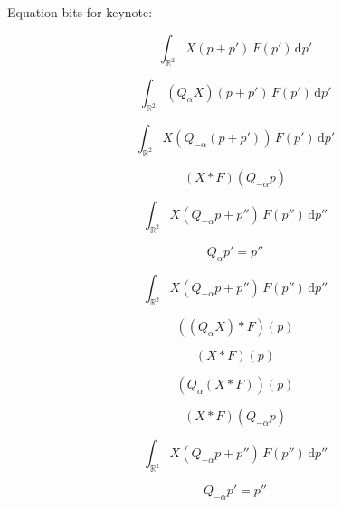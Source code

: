 \documentclass[12pt]{article}
\begin{document}
Equation bits for keynote:

\begin{equation}
  \int_{\mathbb{R}^2}
  X(p + p')\,
  F(p')\,\mathrm{d}p'
\end{equation}


\begin{equation}
  \int_{\mathbb{R}^2} (Q_\alpha X)(p + p')\,F(p')\,\mathrm{d}p'
\end{equation}


\begin{equation}
  \int_{\mathbb{R}^2} X(Q_{-\alpha}(p + p'))\,F(p')\,\mathrm{d}p'
\end{equation}

\begin{equation}
  (X * F)(Q_{-\alpha} p)
\end{equation}

\begin{equation}
  \int_{\mathbb{R}^2} X(Q_{-\alpha} p + p'')\,F(p'')\,\mathrm{d}p''
\end{equation}


\begin{equation}
  Q_\alpha p' = p''
\end{equation}



\begin{equation}
  \int_{\mathbb{R}^2} X(Q_{-\alpha} p + p'')\,F(p'')\,\mathrm{d}p''
\end{equation}


\begin{equation}
  ((Q_\alpha X) * F)(p)
\end{equation}


\begin{equation}
  (X * F)(p)
\end{equation}

\begin{equation}
  (Q_\alpha (X * F))(p)
\end{equation}

\begin{equation}
  (X * F)(Q_{-\alpha} p)
\end{equation}

\begin{equation}
  \int_{\mathbb{R}^2} X(Q_{-\alpha} p + p'')\,F(p'')\,\mathrm{d}p''
\end{equation}


\begin{equation}
  Q_{-\alpha} p' = p''
\end{equation}
\end{document}

